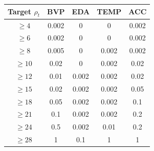 \begin{tabular}{ccccc}
\toprule
Target $\rho_t$ & BVP & EDA & TEMP & ACC \\
\midrule
$\ge4$ & 0.002 & 0 & 0 & 0.002 \\
$\ge6$ & 0.002 & 0 & 0 & 0.002 \\
$\ge8$ & 0.005 & 0 & 0.002 & 0.002 \\
$\ge10$ & 0.02 & 0 & 0.002 & 0.02 \\
$\ge12$ & 0.01 & 0.002 & 0.002 & 0.02 \\
$\ge15$ & 0.02 & 0.002 & 0.002 & 0.05 \\
$\ge18$ & 0.05 & 0.002 & 0.002 & 0.1 \\
$\ge21$ & 0.1 & 0.002 & 0.002 & 0.2 \\
$\ge24$ & 0.5 & 0.002 & 0.01 & 0.2 \\
$\ge28$ & 1 & 0.1 & 1 & 1 \\
\bottomrule
\end{tabular}
